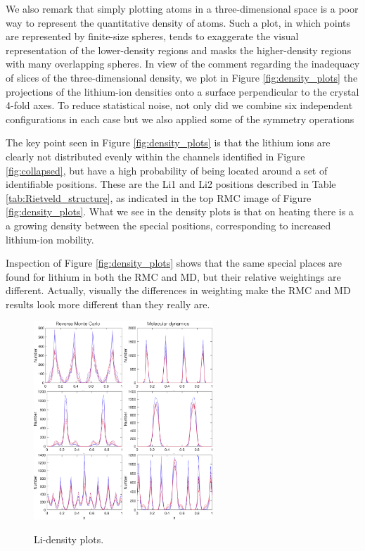 \documentclass[twoside,twocolumn,9pt]{article}
\begin{document}
We also remark that simply plotting atoms in a three-dimensional space is a poor way to represent the quantitative density of atoms. Such a plot, in which points are represented by finite-size spheres, tends to exaggerate the visual representation of the lower-density regions and masks the higher-density regions with many overlapping spheres. In view of the comment regarding the inadequacy of slices of the three-dimensional density, we plot in Figure \ref{fig:density_plots} the projections of the lithium-ion densities onto a surface perpendicular to the crystal 4-fold axes. To reduce statistical noise, not only did we combine six independent configurations in each case but we also applied some of the symmetry operations

The key point seen in Figure \ref{fig:density_plots} is that the lithium ions are clearly not distributed evenly within the channels identified in Figure \ref{fig:collapsed}, but have a high probability of being located around a set of identifiable positions. These are the Li1 and Li2 positions described in Table \ref{tab:Rietveld_structure}, as indicated in the top RMC image of Figure \ref{fig:density_plots}. What we see in the density plots is that on heating there is a a growing density between the special positions, corresponding to increased lithium-ion mobility.

Inspection of Figure \ref{fig:density_plots} shows that the same special places are found for lithium in both the RMC and MD, but their relative weightings are different. Actually, visually the differences in weighting make the RMC and MD results look more different than they really are.

\begin{figure}[t]
\begin{center}
\includegraphics[width=0.6\textwidth]{pics/site_density.pdf}
\label{fig:density_plots}
\caption{\label{fig:site_density}  Li-density plots.}
\end{center}
\end{figure}
\end{document}
